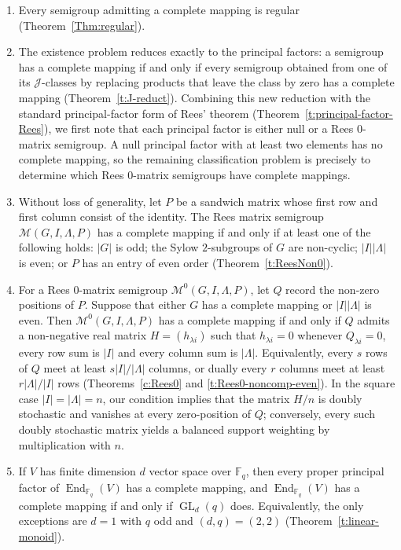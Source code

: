 \documentclass[11pt]{article}
\theoremstyle{plain}
\theoremstyle{remark}
\theoremstyle{definition}
\theoremstyle{plain}
\newcommand{\End}{\mathop{\mathrm{End}}}
\begin{document}
\begin{enumerate}\itemsep0pt
\item Every semigroup admitting a complete mapping is regular
(Theorem~\ref{Thm:regular}).

\item The existence problem reduces exactly to the principal factors: a
semigroup has a complete mapping if and only if every semigroup obtained from
one of its $\mathcal J$-classes by replacing products that leave the class by
zero has a complete mapping (Theorem~\ref{t:J-reduct}).
 Combining this new reduction with the standard principal-factor
form of Rees' theorem (Theorem~\ref{t:principal-factor-Rees}), we first note that each principal
factor is either null or a Rees $0$-matrix semigroup. A null principal factor
with at least two elements has no complete mapping, so the remaining
classification problem is precisely to determine which Rees $0$-matrix
semigroups have complete mappings.

\item Without loss of generality, let $P$ be a sandwich matrix whose first row and first column consist of
the identity. The Rees matrix semigroup $\mathcal M(G,I,\Lambda,P)$ has a
complete mapping if and only if at least one of the following holds: $|G|$ is
odd; the Sylow $2$-subgroups of $G$ are non-cyclic; $|I||\Lambda|$ is even; or
$P$ has an entry of even order (Theorem~\ref{t:ReesNon0}).

\item For a Rees $0$-matrix semigroup
$\mathcal M^0(G,I,\Lambda,P)$, let $Q$ record the non-zero positions of $P$.
Suppose that either $G$ has a complete mapping or $|I||\Lambda|$ is even.
Then $\mathcal M^0(G,I,\Lambda,P)$ has a complete mapping if and only if $Q$
admits a non-negative real matrix $H=(h_{\lambda i})$ such that
$h_{\lambda i}=0$ whenever $Q_{\lambda i}=0$, every row sum is $|I|$ and
every column sum is $|\Lambda|$. Equivalently, every $s$ rows of $Q$ meet at
least $s|I|/|\Lambda|$ columns, or dually every $r$ columns meet at least
$r|\Lambda|/|I|$ rows (Theorems~\ref{c:Rees0} and
\ref{t:Rees0-noncomp-even}). {In the square case
$|I|=|\Lambda|=n$, our condition implies that the matrix $H/n$ is doubly stochastic and vanishes at every
zero-position of $Q$; conversely, every such doubly stochastic matrix yields a
balanced support weighting by multiplication with $n$.}

\item If $V$ has finite dimension $d$ vector space over $\mathbb F_q$, then every proper
principal factor of $\End_{\mathbb F_q}(V)$ has a complete mapping, and
$\End_{\mathbb F_q}(V)$ has a complete mapping if and only if
$\operatorname{GL}_d(q)$ does. Equivalently, the only exceptions are $d=1$
with $q$ odd and $(d,q)=(2,2)$ (Theorem~\ref{t:linear-monoid}).


\end{enumerate}
\end{document}
